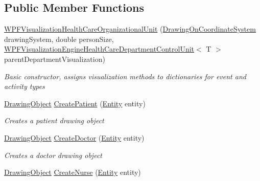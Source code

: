 \subsection*{Public Member Functions}
\begin{DoxyCompactItemize}
\item 
\hyperlink{class_sample_hospital_model_1_1_visualization_1_1_w_p_f_visualization_health_care_organizational_unit_af350f9df823ea48c8bf9617c50abf706}{W\+P\+F\+Visualization\+Health\+Care\+Organizational\+Unit} (\hyperlink{class_w_p_f_visualization_base_1_1_drawing_on_coordinate_system}{Drawing\+On\+Coordinate\+System} drawing\+System, double person\+Size, \hyperlink{class_sample_hospital_model_1_1_visualization_1_1_w_p_f_visualization_engine_health_care_department_control_unit}{W\+P\+F\+Visualization\+Engine\+Health\+Care\+Department\+Control\+Unit}$<$ T $>$ parent\+Department\+Visualization)
\begin{DoxyCompactList}\small\item\em Basic constructor, assigns visualization methods to dictionaries for event and activity types \end{DoxyCompactList}\item 
\hyperlink{class_w_p_f_visualization_base_1_1_drawing_object}{Drawing\+Object} \hyperlink{class_sample_hospital_model_1_1_visualization_1_1_w_p_f_visualization_health_care_organizational_unit_a327536972d46eaef1d2f597f8a92be83}{Create\+Patient} (\hyperlink{class_simulation_core_1_1_h_c_c_m_elements_1_1_entity}{Entity} entity)
\begin{DoxyCompactList}\small\item\em Creates a patient drawing object \end{DoxyCompactList}\item 
\hyperlink{class_w_p_f_visualization_base_1_1_drawing_object}{Drawing\+Object} \hyperlink{class_sample_hospital_model_1_1_visualization_1_1_w_p_f_visualization_health_care_organizational_unit_a50716d03b9b39501b6166ce89445cf63}{Create\+Doctor} (\hyperlink{class_simulation_core_1_1_h_c_c_m_elements_1_1_entity}{Entity} entity)
\begin{DoxyCompactList}\small\item\em Creates a doctor drawing object \end{DoxyCompactList}\item 
\hyperlink{class_w_p_f_visualization_base_1_1_drawing_object}{Drawing\+Object} \hyperlink{class_sample_hospital_model_1_1_visualization_1_1_w_p_f_visualization_health_care_organizational_unit_a44edceaffd5591eb153456271e70435d}{Create\+Nurse} (\hyperlink{class_simulation_core_1_1_h_c_c_m_elements_1_1_entity}{Entity} entity)

\end{DoxyCompactItemize}
